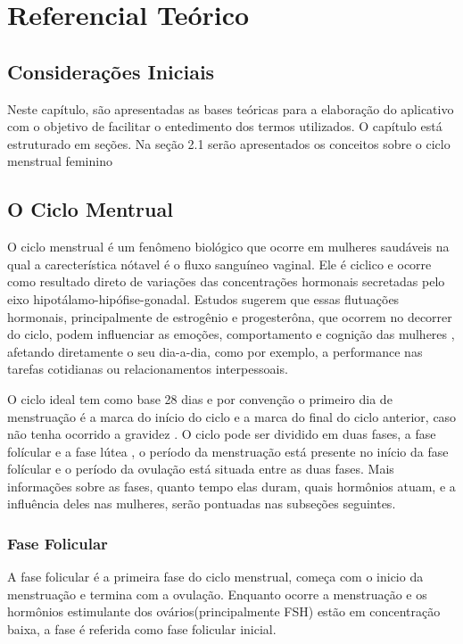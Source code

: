 \chapter[Referencial Teórico]{Referencial Teórico}

\section{Considerações Iniciais}

Neste capítulo, são apresentadas as bases teóricas para a elaboração do aplicativo com o objetivo de facilitar o entedimento dos termos utilizados. O capítulo está estruturado em seções. Na seção 2.1 serão apresentados os conceitos sobre o ciclo menstrual feminino

\section{O Ciclo Mentrual}

O ciclo menstrual é um fenômeno biológico que ocorre em mulheres saudáveis na qual a carecterística nótavel é o fluxo sanguíneo vaginal\cite{guyton2012}. Ele é ciclico e ocorre como resultado direto de variações das concentrações hormonais secretadas pelo eixo hipotálamo-hipófise-gonadal. Estudos sugerem que essas flutuações hormonais, principalmente de estrogênio e progesterôna, que ocorrem no decorrer do ciclo, podem influenciar as emoções, comportamento e cognição das mulheres \cite{poroma2014}, afetando diretamente o seu dia-a-dia, como por exemplo, a performance nas tarefas cotidianas ou relacionamentos interpessoais.

O ciclo ideal tem como base 28 dias e por convenção o primeiro dia de menstruação é a marca do início do ciclo e a marca do final do ciclo anterior, caso não tenha ocorrido a gravidez \cite{lenton1984a}. O ciclo pode ser dividido em duas fases, a fase folícular e a fase lútea \cite{brondin2008}, o período da menstruação está presente no início da fase folícular e o período da ovulação está situada entre as duas fases. Mais informações sobre as fases, quanto tempo elas duram, quais hormônios atuam, e a influência deles nas mulheres, serão pontuadas nas subseções seguintes. 

\subsection{Fase Folicular}

A fase folicular é a primeira fase do ciclo menstrual, começa com o inicio da menstruação e termina com a ovulação. Enquanto ocorre a menstruação e os hormônios estimulante dos ovários(principalmente FSH) estão em concentração baixa, a fase é referida como fase folicular inicial\cite{lenton1984a}.

